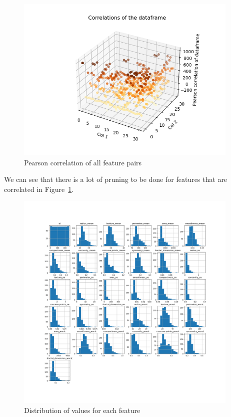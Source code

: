 \documentclass[12pt, a4paper]{article}
\begin{document}
    \begin{figure}[H]
        \begin{center}
            \includegraphics[width=0.95\textwidth]{figures/Correlations of the dataframe.png}
        \end{center}
        \caption{Pearson correlation of all feature pairs}\label{fig:corr}
    \end{figure}

\begin{multicols}{2}

    We can see that there is a lot of pruning to be done for features that are correlated in Figure~\ref{fig:corr}.
    \newline

\end{multicols}

    \begin{figure}[H]
        \begin{center}
            \includegraphics[width=0.95\textwidth]{figures/Data feature histograms.png}
        \end{center}
        \caption{Distribution of values for each feature}\label{fig:hists}
    \end{figure}
\end{document}
